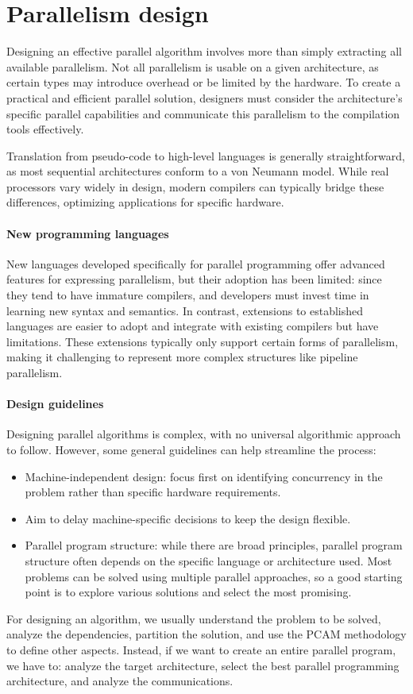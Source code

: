 \section{Parallelism design}

Designing an effective parallel algorithm involves more than simply extracting all available parallelism. 
Not all parallelism is usable on a given architecture, as certain types may introduce overhead or be limited by the hardware. 
To create a practical and efficient parallel solution, designers must consider the architecture's specific parallel capabilities and communicate this parallelism to the compilation tools effectively.

Translation from pseudo-code to high-level languages is generally straightforward, as most sequential architectures conform to a von Neumann model. 
While real processors vary widely in design, modern compilers can typically bridge these differences, optimizing applications for specific hardware.

\paragraph*{New programming languages}
New languages developed specifically for parallel programming offer advanced features for expressing parallelism, but their adoption has been limited: since they tend to have immature compilers, and developers must invest time in learning new syntax and semantics.
In contrast, extensions to established languages are easier to adopt and integrate with existing compilers but have limitations. 
These extensions typically only support certain forms of parallelism, making it challenging to represent more complex structures like pipeline parallelism.

\paragraph*{Design guidelines}
Designing parallel algorithms is complex, with no universal algorithmic approach to follow. 
However, some general guidelines can help streamline the process: 
\begin{itemize}
    \item Machine-independent design: focus first on identifying concurrency in the problem rather than specific hardware requirements. 
    \item Aim to delay machine-specific decisions to keep the design flexible.
    \item Parallel program structure: while there are broad principles, parallel program structure often depends on the specific language or architecture used. 
        Most problems can be solved using multiple parallel approaches, so a good starting point is to explore various solutions and select the most promising.
\end{itemize}
For designing an algorithm, we usually understand the problem to be solved, analyze the dependencies, partition the solution, and use the PCAM methodology to define other aspects. 
Instead, if we want to create an entire parallel program, we have to: analyze the target architecture, select the best parallel programming architecture, and analyze the communications. 

